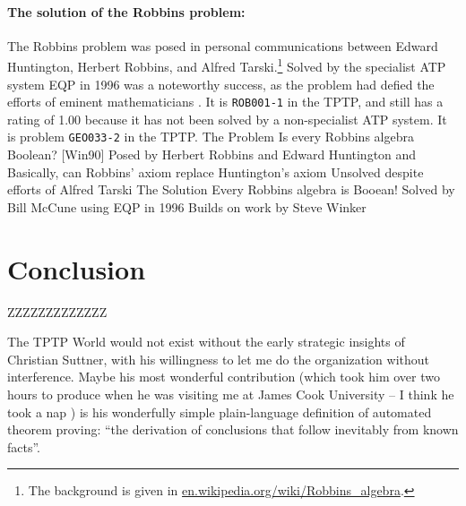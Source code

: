 \documentclass[runningheads]{llncs}
\begin{document}
\paragraph{The solution of the Robbins problem:}
The Robbins problem was posed in personal communications between Edward Huntington,
Herbert Robbins, and Alfred Tarski.\footnote{%
The background is given in
\href{https://en.wikipedia.org/wiki/Robbins_algebra}{en.wikipedia.org/wiki/Robbins\_algebra}.}
Solved by the specialist ATP system EQP \cite{McC97}
in 1996 was a noteworthy success, as the problem had defied the efforts of eminent
mathematicians \cite{HMT71}.
It is {\tt ROB001-1} in the TPTP, and still has a rating of 1.00 because
it has not been solved by a non-specialist ATP system.
It is problem {\tt GEO033-2} in the TPTP.
The Problem
Is every Robbins algebra Boolean? [Win90]
Posed by Herbert Robbins and Edward Huntington and
Basically, can Robbins' axiom replace Huntington's axiom
Unsolved despite efforts of Alfred Tarski
The Solution
Every Robbins algebra is Booean!
Solved by Bill McCune using EQP in 1996
Builds on work by Steve Winker

\section{Conclusion}
\label{Conclusion}

ZZZZZZZZZZZZZ

The TPTP World would not exist without the early strategic insights of Christian Suttner,
with his willingness to let me do the organization without interference. 
Maybe his most wonderful contribution (which took him over two hours to produce when he
was visiting me at James Cook University -- I think he took a nap \smiley) is his 
wonderfully simple plain-language definition of automated theorem proving: 
``the derivation of conclusions that follow inevitably from known facts''.



\end{document}
